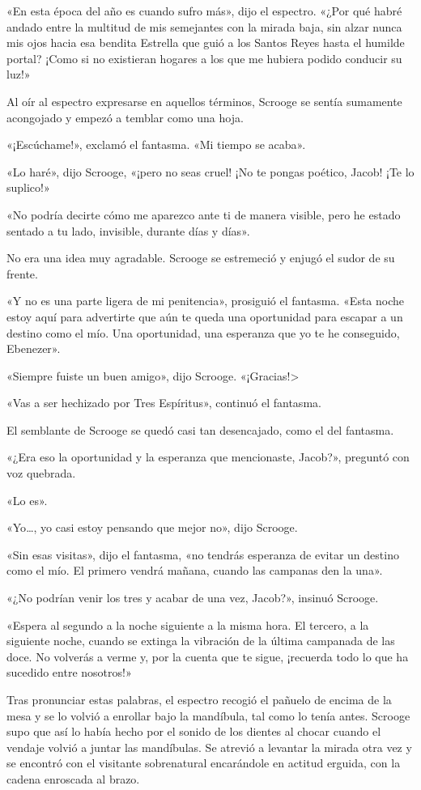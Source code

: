 \documentclass{novela}
\begin{document}
 «En esta época del año es cuando sufro más», dijo el espectro. «¿Por qué habré andado entre la multitud de mis semejantes con la mirada baja, sin alzar nunca mis ojos hacia esa bendita Estrella que guió a los Santos Reyes hasta el humilde portal? ¡Como si no existieran hogares a los que me hubiera podido conducir su luz!»

 Al oír al espectro expresarse en aquellos términos, Scrooge se sentía sumamente acongojado y empezó a temblar como una hoja.

 «¡Escúchame!», exclamó el fantasma. «Mi tiempo se acaba».

 «Lo haré», dijo Scrooge, «¡pero no seas cruel! ¡No te pongas poético, Jacob! ¡Te lo suplico!»

 «No podría decirte cómo me aparezco ante ti de manera visible, pero he estado sentado a tu lado, invisible, durante días y días».

 No era una idea muy agradable. Scrooge se estremeció y enjugó el sudor de su frente.

 «Y no es una parte ligera de mi penitencia», prosiguió el fantasma. «Esta noche estoy aquí para advertirte que aún te queda una oportunidad para escapar a un destino como el mío. Una oportunidad, una esperanza que yo te he conseguido, Ebenezer».

 «Siempre fuiste un buen amigo», dijo Scrooge. «¡Gracias!>

 «Vas a ser hechizado por Tres Espíritus», continuó el fantasma.

 El semblante de Scrooge se quedó casi tan desencajado, como el del fantasma.

 «¿Era eso la oportunidad y la esperanza que mencionaste, Jacob?», preguntó con voz quebrada.

 «Lo es».

 «Yo{\ldots}, yo casi estoy pensando que mejor no», dijo Scrooge.

 «Sin esas visitas», dijo el fantasma, «no tendrás esperanza de evitar un destino como el mío. El primero vendrá mañana, cuando las campanas den la una».

 «¿No podrían venir los tres y acabar de una vez, Jacob?», insinuó Scrooge.

 «Espera al segundo a la noche siguiente a la misma hora. El tercero, a la siguiente noche, cuando se extinga la vibración de la última campanada de las doce. No volverás a verme y, por la cuenta que te sigue, ¡recuerda todo lo que ha sucedido entre nosotros!»

 Tras pronunciar estas palabras, el espectro recogió el pañuelo de encima de la mesa y se lo volvió a enrollar bajo la mandíbula, tal como lo tenía antes. Scrooge supo que así lo había hecho por el sonido de los dientes al chocar cuando el vendaje volvió a juntar las mandíbulas. Se atrevió a levantar la mirada otra vez y se encontró con el visitante sobrenatural encarándole en actitud erguida, con la cadena enroscada al brazo.
\end{document}
